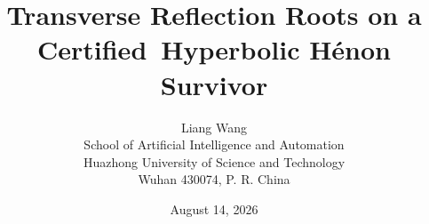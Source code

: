 \documentclass[11pt]{article}
\title{Transverse Reflection Roots on a Certified\
Hyperbolic H\'enon Survivor}
\author{Liang Wang\\
\small School of Artificial Intelligence and Automation\\[-1mm]
\small Huazhong University of Science and Technology\\[-1mm]
\small Wuhan 430074, P. R. China}
\date{August 14, 2026}
\theoremstyle{remark}
\begin{document}
\maketitle










\renewcommand{\bibfont}{\small}


\appendix

\end{document}
